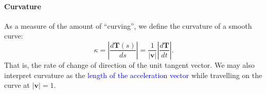 \paragraph{Curvature}
As a measure of the amount of ``curving'', we define the
\textcolor{Bittersweet}{curvature} of a smooth curve:
\[\kappa=\left| \frac{d \mathbf{T}\left( s \right) }{ds} \right|=\frac{1}{\left| \mathbf{v} \right|} \left| \frac{d \mathbf{T}}{dt} \right|.\]
That is, the rate of change of direction of the unit tangent vector.
We may also interpret curvature as the \textcolor{Blue}{length of the
acceleration vector} while travelling on the curve at $\left| \mathbf{v}
\right| =1$.
